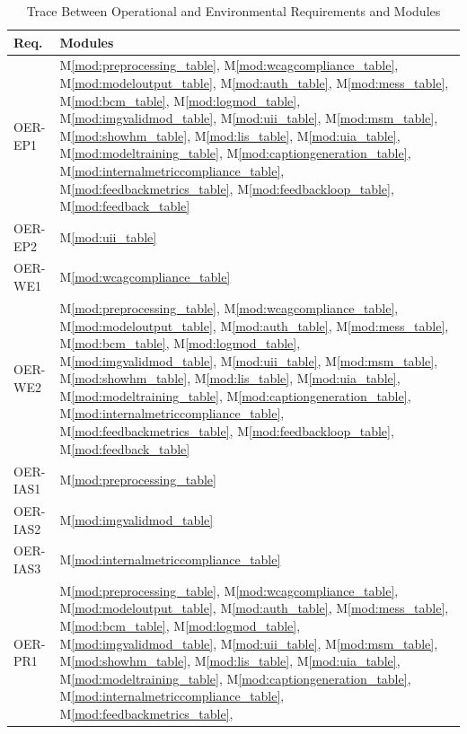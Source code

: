 \documentclass[12pt, titlepage]{article}
\newcommand{\mref}[1]{M\ref{#1}}
\begin{document}
\begin{table}[H]
  \caption{Trace Between Operational and Environmental Requirements and Modules}
  \label{TblOERT}
  \centering
  \small
  \begin{tabularx}{\textwidth}{>{\RaggedRight\arraybackslash}p{}Y}
    \toprule
    \textbf{Req.} & \textbf{Modules}\\
    \midrule
    OER-EP1 &  \mref{mod:preprocessing_table},
    \mref{mod:wcagcompliance_table}, \mref{mod:modeloutput_table},
    \mref{mod:auth_table}, \mref{mod:mess_table},
    \mref{mod:bcm_table}, \mref{mod:logmod_table},
    \mref{mod:imgvalidmod_table}, \mref{mod:uii_table},
    \mref{mod:msm_table},  \mref{mod:showhm_table},
    \mref{mod:lis_table}, \mref{mod:uia_table}, \mref{mod:modeltraining_table},
    \mref{mod:captiongeneration_table},
    \mref{mod:internalmetriccompliance_table}, \mref{mod:feedbackmetrics_table},
    \mref{mod:feedbackloop_table}, \mref{mod:feedback_table}\\
    OER-EP2 & \mref{mod:uii_table}\\
    OER-WE1 & \mref{mod:wcagcompliance_table}\\
    OER-WE2 & \mref{mod:preprocessing_table},
    \mref{mod:wcagcompliance_table}, \mref{mod:modeloutput_table},
    \mref{mod:auth_table}, \mref{mod:mess_table},
    \mref{mod:bcm_table}, \mref{mod:logmod_table},
    \mref{mod:imgvalidmod_table}, \mref{mod:uii_table},
    \mref{mod:msm_table},  \mref{mod:showhm_table},
    \mref{mod:lis_table}, \mref{mod:uia_table}, \mref{mod:modeltraining_table},
    \mref{mod:captiongeneration_table},
    \mref{mod:internalmetriccompliance_table}, \mref{mod:feedbackmetrics_table},
    \mref{mod:feedbackloop_table}, \mref{mod:feedback_table}\\
    OER-IAS1 & \mref{mod:preprocessing_table}\\
    OER-IAS2 & \mref{mod:imgvalidmod_table}\\
    OER-IAS3 & \mref{mod:internalmetriccompliance_table}\\
    OER-PR1 &  \mref{mod:preprocessing_table},
    \mref{mod:wcagcompliance_table}, \mref{mod:modeloutput_table},
    \mref{mod:auth_table}, \mref{mod:mess_table},
    \mref{mod:bcm_table}, \mref{mod:logmod_table},
    \mref{mod:imgvalidmod_table}, \mref{mod:uii_table},
    \mref{mod:msm_table},  \mref{mod:showhm_table},
    \mref{mod:lis_table}, \mref{mod:uia_table}, \mref{mod:modeltraining_table},
    \mref{mod:captiongeneration_table},
    \mref{mod:internalmetriccompliance_table}, \mref{mod:feedbackmetrics_table},

\end{tabularx}
\end{table}
\end{document}
